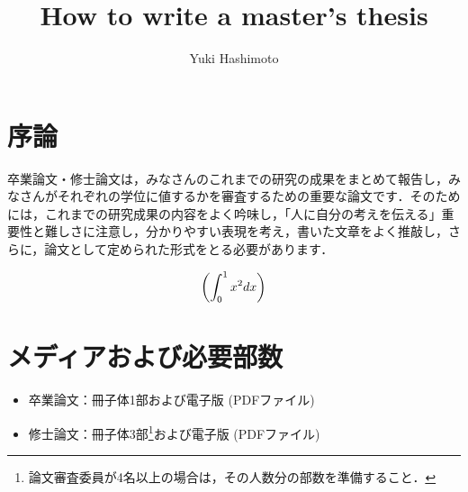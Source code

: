 \documentclass[12pt]{kupaper}
\begin{document}


\title{How to write a master's thesis}
\author{Yuki Hashimoto}


\Maketitle

\setcounter{page}{1}
\tableofcontents

\chapter{序論}

卒業論文・修士論文は，みなさんのこれまでの研究の成果をまとめて報告し，みなさんがそれぞれの学位に値するかを審査するための重要な論文です．そのためには，これまでの研究成果の内容をよく吟味し，「人に自分の考えを伝える」重要性と難しさに注意し，分かりやすい表現を考え，書いた文章をよく推敲し，さらに，論文として定められた形式をとる必要があります\cite{G_ng_r_2021}．

\begin{equation}
	\qty( \int_0^1 x^2 dx )
\end{equation}

\chapter{メディアおよび必要部数}
\begin{itemize}
	\item 卒業論文：冊子体1部および電子版 (PDFファイル)
	\item 修士論文：冊子体3部\footnote{論文審査委員が4名以上の場合は，その人数分の部数を準備すること．}および電子版 (PDFファイル)
\end{itemize}
\end{document}
